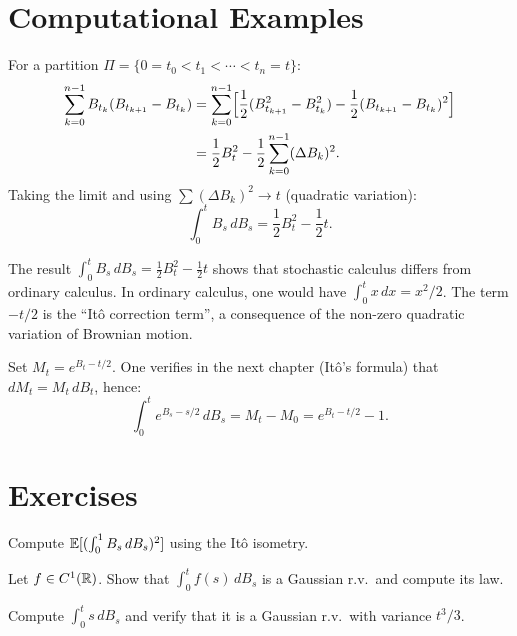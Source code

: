\section{Computational Examples}

\begin{example}[$\int_0^t B_s \, dB_s$]
For a partition $\Pi = \{0 = t_0 < t_1 < \cdots < t_n = t\}$:
\begin{align*}
  \sum_{k=0}^{n-1} B_{t_k}(B_{t_{k+1}} - B_{t_k})
  &= \sum_{k=0}^{n-1} \Bigl[\frac{1}{2}(B_{t_{k+1}}^2 - B_{t_k}^2)
    - \frac{1}{2}(B_{t_{k+1}} - B_{t_k})^2\Bigr] \\
  &= \frac{1}{2} B_t^2 - \frac{1}{2} \sum_{k=0}^{n-1} (\Delta B_k)^2.
\end{align*}
Taking the limit and using $\sum (\Delta B_k)^2 \to t$ (quadratic variation):
\[
  \int_0^t B_s \, dB_s = \frac{1}{2} B_t^2 - \frac{1}{2} t.
\]
\end{example}

\begin{warning}[title=\textbf{The $-t/2$ Term}]
The result $\int_0^t B_s \, dB_s = \frac{1}{2}B_t^2 - \frac{1}{2}t$ shows that
stochastic calculus differs from ordinary calculus. In ordinary calculus, one
would have $\int_0^t x \, dx = x^2/2$. The term $-t/2$ is the ``It\^o correction
term'', a consequence of the non-zero quadratic variation of Brownian motion.
\end{warning}

\begin{example}[$\int_0^t e^{B_s - s/2} \, dB_s$]
Set $M_t = e^{B_t - t/2}$. One verifies in the next chapter (It\^o's formula)
that $dM_t = M_t \, dB_t$, hence:
\[
  \int_0^t e^{B_s - s/2} \, dB_s = M_t - M_0 = e^{B_t - t/2} - 1.
\]
\end{example}

\section{Exercises}

\begin{exercise}
Compute $\mathbb{E}[(\int_0^1 B_s \, dB_s)^2]$ using the It\^o isometry.
\end{exercise}

\begin{exercise}
Let $f \in C^1(\mathbb{R})$. Show that $\int_0^t f(s) \, dB_s$ is a Gaussian r.v.\ and
compute its law.
\end{exercise}

\begin{exercise}
Compute $\int_0^t s \, dB_s$ and verify that it is a Gaussian r.v.\ with
variance $t^3/3$.
\end{exercise}

